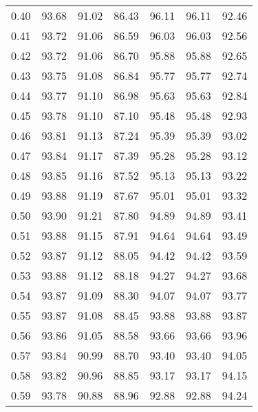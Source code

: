 \begin{tabular}{|c|c|c|c|c|c|c|}
      0.40 &     93.68 &     91.02 &      86.43 &   96.11 &      96.11 &         92.46 \\
      0.41 &     93.72 &     91.06 &      86.59 &   96.03 &      96.03 &         92.56 \\
      0.42 &     93.72 &     91.06 &      86.70 &   95.88 &      95.88 &         92.65 \\
      0.43 &     93.75 &     91.08 &      86.84 &   95.77 &      95.77 &         92.74 \\
      0.44 &     93.77 &     91.10 &      86.98 &   95.63 &      95.63 &         92.84 \\
      0.45 &     93.78 &     91.10 &      87.10 &   95.48 &      95.48 &         92.93 \\
      0.46 &     93.81 &     91.13 &      87.24 &   95.39 &      95.39 &         93.02 \\
      0.47 &     93.84 &     91.17 &      87.39 &   95.28 &      95.28 &         93.12 \\
      0.48 &     93.85 &     91.16 &      87.52 &   95.13 &      95.13 &         93.22 \\
      0.49 &     93.88 &     91.19 &      87.67 &   95.01 &      95.01 &         93.32 \\
      0.50 &     93.90 &     91.21 &      87.80 &   94.89 &      94.89 &         93.41 \\
      0.51 &     93.88 &     91.15 &      87.91 &   94.64 &      94.64 &         93.49 \\
      0.52 &     93.87 &     91.12 &      88.05 &   94.42 &      94.42 &         93.59 \\
      0.53 &     93.88 &     91.12 &      88.18 &   94.27 &      94.27 &         93.68 \\
      0.54 &     93.87 &     91.09 &      88.30 &   94.07 &      94.07 &         93.77 \\
      0.55 &     93.87 &     91.08 &      88.45 &   93.88 &      93.88 &         93.87 \\
      0.56 &     93.86 &     91.05 &      88.58 &   93.66 &      93.66 &         93.96 \\
      0.57 &     93.84 &     90.99 &      88.70 &   93.40 &      93.40 &         94.05 \\
      0.58 &     93.82 &     90.96 &      88.85 &   93.17 &      93.17 &         94.15 \\
      0.59 &     93.78 &     90.88 &      88.96 &   92.88 &      92.88 &         94.24 \\

\end{tabular}
